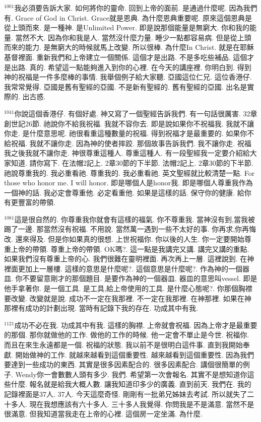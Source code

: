 \documentclass{book}
\begin{document}
$^{1001}$我必須要告訴大家.
如何將你的靈命.
回到上帝的面前.
是通過什麼呢.
因為我們有.
Grace of God in Christ.
Grace就是恩典.
為什麼恩典重要呢.
原來這個恩典是從上頭而來.
是一種神.
是Unlimited Power.
即是說那個能量是無窮大.
你和我的能量.
當然不大.
因為你和我是人.
當然沒什麼力量.
睡少一點都容易病.
但是從上頭而來的能力.
是無窮大的時候就馬上改變.
所以很棒.
為什麼In Christ.
就是在耶穌基督裡面.
重新我們和上帝建立一個關係.
這個才是出路.
不是多吃些補品.
這個才是出路.
真的.
希望這一點能夠進入到你的心裡.
在今天的講座裡.
你明白到.
得到神的祝福是一件多麼棒的事情.
我舉個例子給大家聽.
亞國這位仁兄.
這位香港仔.
我常常覺得.
亞國是舊有聖經的亞國.
不是新有聖經的.
舊有聖經的亞國.
出名是實際的.
出古惑.

$^{1041}$你說這個香港仔.
有個好處.
神又寫了一個聖經告訴我們.
有一句話很厲害.
32章創世記26節.
祂說你不給我祝福.
我就不容你去.
即是說如果你不祝福我.
我就不讓你走.
是什麼意思呢.
祂很看重這種數量的祝福.
得到祝福才是最重要的.
如果你不給祝福.
我就不讓你走.
因為神的使者摔跤.
那個故事告訴我們.
我不讓你走.
祝福我之後我就不讓你走.
神很尊重這種人.
尊重這種人.
有一段聖經我一定要介紹給大家知道.
請你寫下.
在法帽2記上.
2章30節的下半節.
法帽2記上.
2章30節的下半節.
祂說尊重我的.
我必重看祂.
尊重我的.
我必重看祂.
英文聖經就比較清楚一點.
For those who honor me.
I will honor.
即是哪個人是honor我.
即是哪個人尊重我作為一個神的話.
我必定會尊重他.
必定看重他.
如果是這樣的話.
保守你的健康.
給你有更豐富的帶領.

$^{1081}$這是很自然的.
你尊重我你就會有這樣的福氣.
你不尊重我.
當神沒有到,當我被踢了一邊.
那當然沒有祝福.
不用說.
當然萬一遇到一些不太好的事.
你再求,你再悔改.
還來得及.
但是你如果真的很想.
上世祝福你.
你以後的人生.
你一定要開始尊重上帝的帶領.
尊重上帝的帶領.
OK嗎?.
這一點是我講完又講.
講完又講的重點.
如果我們沒有尊重上帝的心.
我們很難在靈明裡面.
再次再上一層.
這裡說到.
在神裡面更加上一層樓.
這樣的意思是什麼呢?.
這個意思是什麼呢?.
作為神的一個器皿.
你不要留意剛才的那個題目.
是要作為神的一個器皿.
器皿的意思叫vessel.
即是他手拿著你.
是一個工具.
是工具,給上帝使用的工具.
是什麼心態呢?.
你那個胸襟要改變.
改變就是說.
成功不一定在我那裡.
不一定在我那裡.
在神那裡.
如果在神那裡有成功的計劃出現.
當時有記錄下我的存在.
功成其中有我.

$^{1121}$成功不必在我.
功成其中有我.
這樣的胸襟.
上帝就會祝福.
因為上帝才是最重要的那個.
那你就做他的工作.
做他的工作的時候.
他一定會不單止是今世.
祝福你.
而且在來生永遠都是一個.
祝福的狀態.
我以前不是很明白這件事.
直到我開始奉獻.
開始做神的工作.
就越來越看到這個重要性.
越來越看到這個重要性.
因為我們要達到一些成功的東西.
其實是很多因素配合的.
很多因素配合.
講個很簡單的例子.
Wendy你一會數數人頭有多少.
我們.
希望第一次會報名.
其實不是想知道你這些什麼.
報名就是給我大概人數.
讓我知道印多少的廣義.
直到前天.
我們在.
我的記錄裡面是37人.
37人.
今天這麼奇怪.
剛剛有一批弟兄姊妹去考試.
所以就失了二十多人.
現在我想應該有六十多人.
三十多人我覺得.
你問我是不是滿意.
當然不是很滿意.
但我知道當我走在上帝的心裡.
這個房一定坐滿.
為什麼.
\end{document}
